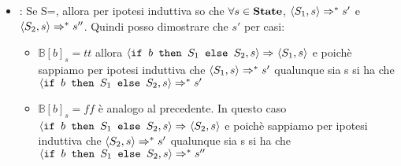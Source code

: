 {\begin{itemize}
	\item {}: Se 
	S=, allora per ipotesi induttiva so che 
	$\forall{}s\in\states$, $\confSs{S_1}{s}\Rar{*}s'$ e 
	$\confSs{S_2}{s}\Rar{*}s''$. Quindi posso dimostrare che 
	\Rar{*}$s'$ per casi:
	\begin{itemize}
	\item $\mathbb{B}[b]_s=tt$ allora 
	$\confSs{\ifABC{b}{S_1}{S_2}}{s}\Rar{}\confSs{{S_1}}{s}$ e poichè sappiamo
	per ipotesi induttiva che $\confSs{S_1}{s}\Rar{*}s'$ qualunque sia s si ha
	che $\confSs{\ifABC{b}{S_1}{S_2}}{s}\Rar{*}s'$

	\item $\mathbb{B}[b]_s=ff$ è analogo al precedente. In questo caso 
	$\confSs{\ifABC{b}{S_1}{S_2}}{s}\Rar{}\confSs{{S_2}}{s}$ e poichè sappiamo
	per ipotesi induttiva che $\confSs{S_2}{s}\Rar{*}s'$ qualunque sia s si ha
	che $\confSs{\ifABC{b}{S_1}{S_2}}{s}\Rar{*}s''$
	\end{itemize}

	\end{itemize}
}
